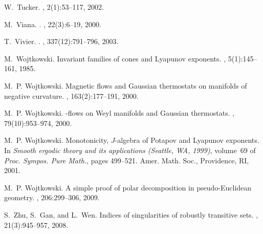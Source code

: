 \documentclass[12pt,reqno]{amsart}
\numberwithin{equation}{section}
\theoremstyle{plain}
\theoremstyle{definition}
\begin{document}
\begin{thebibliography}{10}
W.~Tucker.
, {2}({1}):{53--117}, {2002}.

M.~Viana.
.
, {22}({3}):{6--19}, {2000}.

T.~Vivier.
.
, {337}({12}):{791--796}, {2003}.

M.~Wojtkowski.
\newblock Invariant families of cones and {L}yapunov exponents.
, 5(1):145--161, 1985.

M.~P. Wojtkowski.
\newblock Magnetic flows and {G}aussian thermostats on manifolds of negative
  curvature.
, 163(2):177--191, 2000.

M.~P. Wojtkowski.
-flows on {W}eyl manifolds and {G}aussian thermostats.
, 79(10):953--974, 2000.

M.~P. Wojtkowski.
\newblock Monotonicity, {$J$}-algebra of {P}otapov and {L}yapunov exponents.
\newblock In {\em Smooth ergodic theory and its applications ({S}eattle, {WA},
  1999)}, volume~69 of {\em Proc. Sympos. Pure Math.}, pages 499--521. Amer.
  Math. Soc., Providence, RI, 2001.

M.~P. Wojtkowski.
\newblock A simple proof of polar decomposition in pseudo-{E}uclidean geometry.
, 206:299--306, 2009.

S.~Zhu, S.~Gan, and L.~Wen.
\newblock Indices of singularities of robustly transitive sets.
, 21(3):945--957, 2008.

\end{thebibliography}
\end{document}
